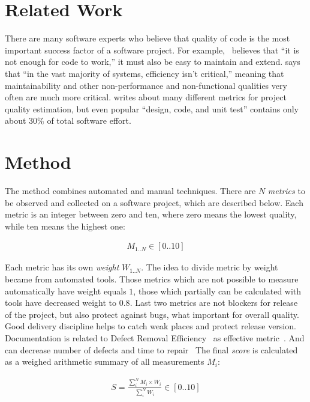 \documentclass[12pt,oneside]{article}
\begin{document}
\section{Related Work}
\label{sec:related}

There are many software experts who believe that quality of code is the
most important success factor of a software project.
For example,~\citet{martin2009clean} believes that ``it is not enough for code to work,''
it must also be easy to maintain and extend.
\citet{mcconnell2004code} says that ``in the vast majority of systems, efficiency isn't critical,''
meaning that maintainability and other non-performance and non-functional
qualities very often are much more critical. \citet{cj-mess} writes about many different metrics for project quality estimation, but even popular ``design, code, and unit test'' contains only about 30\% of total software effort.

\section{Method}
\label{sec:method}

The method combines automated and manual techniques. There are $N$
\emph{metrics} to be observed and collected on a software project, which are described
below. Each metric is an integer between zero and ten, where
zero means the lowest quality, while ten means the highest one:

\begin{eqnarray}
M_{1..N} \in [ 0 .. 10 ]
\end{eqnarray}

Each metric has its own \emph{weight} $W_{1..N}$.
The idea to divide metric by weight became from automated tools. Those metrics which are not possible to measure automatically have weight equals $1$, those which partially can be calculated with tools have decreased weight to $0.8$. Last two metrics are not blockers for release of the project, but also protect against bugs, what important for overall quality. Good delivery discipline helps to catch weak places and protect release version. Documentation is related to Defect Removal Efficiency~\citep{cj-sqin2012,cj-mess} as effective metric~\citep{marandi2014dre}. And can decrease number of defects and time to repair~\citep[pp.265--266]{jones2012economics}
The final \emph{score} is calculated
as a weighed arithmetic summary of all measurements $M_i$:

\begin{align}
S = \frac{\sum_i^N M_i \times W_i}{\sum_i^N W_i} \in [0..10]
\end{align}
\end{document}
